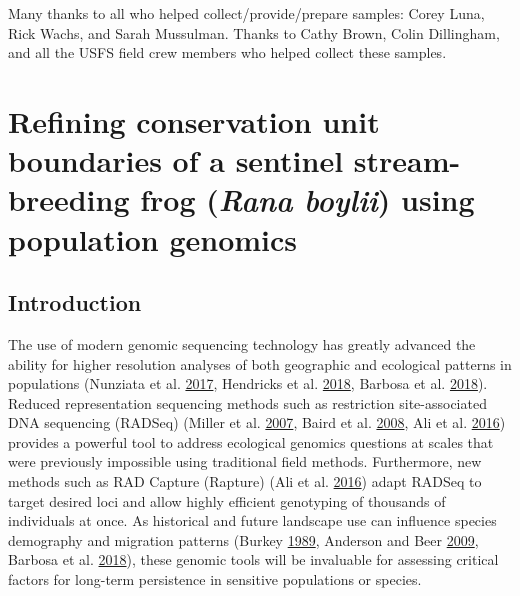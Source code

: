 \documentclass[proquest,12pt,final]{ucthesis-CA2012} %
\begin{document}
\begin{ucmainmatter}
Many thanks to all who helped collect/provide/prepare samples: Corey
Luna, Rick Wachs, and Sarah Mussulman. Thanks to Cathy Brown, Colin
Dillingham, and all the USFS field crew members who helped collect these
samples.

\hypertarget{rangewide}{%
\chapter{\texorpdfstring{Refining conservation unit boundaries of a
sentinel stream-breeding frog (\emph{Rana boylii}) using population
genomics}{Refining conservation unit boundaries of a sentinel stream-breeding frog (Rana boylii) using population genomics}}\label{rangewide}}

\hypertarget{introduction-2}{%
\section{Introduction}\label{introduction-2}}

The use of modern genomic sequencing technology has greatly advanced the
ability for higher resolution analyses of both geographic and ecological
patterns in populations (Nunziata et al.
\protect\hyperlink{ref-nunziata_genomic_2017}{2017}, Hendricks et al.
\protect\hyperlink{ref-hendricks_recent_2018}{2018}, Barbosa et al.
\protect\hyperlink{ref-barbosa_integrative_2018}{2018}). Reduced
representation sequencing methods such as restriction site-associated
DNA sequencing (RADSeq) (Miller et al.
\protect\hyperlink{ref-miller_rapid_2007}{2007}, Baird et al.
\protect\hyperlink{ref-baird_rapid_2008}{2008}, Ali et al.
\protect\hyperlink{ref-ali_rad_2016}{2016}) provides a powerful tool to
address ecological genomics questions at scales that were previously
impossible using traditional field methods. Furthermore, new methods
such as RAD Capture (Rapture) (Ali et al.
\protect\hyperlink{ref-ali_rad_2016}{2016}) adapt RADSeq to target
desired loci and allow highly efficient genotyping of thousands of
individuals at once. As historical and future landscape use can
influence species demography and migration patterns (Burkey
\protect\hyperlink{ref-burkey_extinction_1989}{1989}, Anderson and Beer
\protect\hyperlink{ref-anderson_oceanic_2009}{2009}, Barbosa et al.
\protect\hyperlink{ref-barbosa_integrative_2018}{2018}), these genomic
tools will be invaluable for assessing critical factors for long-term
persistence in sensitive populations or species.


\end{ucmainmatter}
\end{document}
